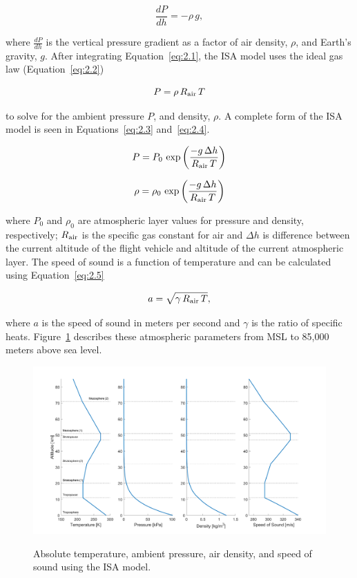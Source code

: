 \begin{equation}
    \frac{dP}{dh} = -\rho \, g,
    \label{eq:2.1}
\end{equation}

where \(\frac{dP}{dh}\) is the vertical pressure gradient as a factor of air density, \( \rho \), and Earth's gravity, \(g\). After integrating Equation~\ref{eq:2.1}, the ISA model uses the ideal gas law (Equation~\ref{eq:2.2})

\begin{equation}
    P = \rho \, R\textsubscript{air} \, T
    \label{eq:2.2}
\end{equation}

to solve for the ambient pressure \(P\), and density, \( \rho \). A complete form of the ISA model is seen in Equations~\ref{eq:2.3} and~\ref{eq:2.4}.

\begin{equation}
    P = P_0\,\exp\left({\frac{-g\,\Delta h}{R\textsubscript{air}\,T}}\right)
    \label{eq:2.3}
\end{equation}

\begin{equation}
    \rho = \rho_0\,\exp\left({\frac{-g\,\Delta h}{R\textsubscript{air}\,T}}\right)
    \label{eq:2.4}
\end{equation}

where \(P_0\) and \(\rho_0\) are atmospheric layer values for pressure and density, respectively; \(R\textsubscript{air}\) is the specific gas constant for air and \(\Delta h\) is difference between the current altitude of the flight vehicle and altitude of the current atmospheric layer. The speed of sound is a function of temperature and can be calculated using Equation~\ref{eq:2.5}

\begin{equation}
    a = \sqrt{\gamma \, R\textsubscript{air}\,T},
    \label{eq:2.5}
\end{equation}

where \(a\) is the speed of sound in meters per second and \( \gamma \) is the ratio of specific heats. Figure~\ref{fig:atmos} describes these atmospheric parameters from MSL to 85,000 meters above sea level.
\begin{figure}
    \centering
    \includegraphics[width=\linewidth]{Figures/atmosphericparameters.png}\label{fig:atmos}
    \caption{Absolute temperature, ambient pressure, air density, and speed of sound using the ISA model.}

\end{figure}

